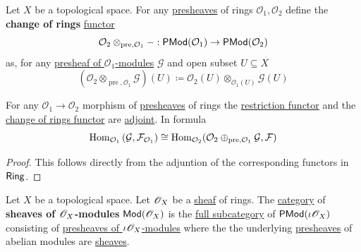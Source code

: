 \documentclass[../../../main]{subfiles}
\begin{document}
\begin{definition} \label{def:tensor-product-presheaf}
  Let \(X\) be a topological space.
  For any \hyperref[def:presheaf]{presheaves} of rings \(\mathcal{O}_{1}, \mathcal{O}_{2}\) define the \textbf{change of rings} \hyperref[def:functor]{functor}
  \begin{equation*}
    \mathcal{O}_{2} \otimes_{\operatorname{pre}, \mathcal{O}_{1}} -: \mathsf{PMod}(\mathcal{O}_{1}) \to \mathsf{PMod}(\mathcal{O}_{2})
  \end{equation*}
  as, for any \hyperref[def:presheaf-of-modules]{presheaf of \(\mathcal{O}_{1}\)-modules} \(\mathcal{G}\) and open subset \(U \subseteq X\)
  \begin{equation*}
    (\mathcal{O}_{2} \otimes_{\operatorname{pre}, \mathcal{O}_{1}} \mathcal{G})(U) \coloneq \mathcal{O}_{2}(U) \otimes_{\mathcal{O}_{1}(U)} \mathcal{G}(U)
  \end{equation*}
\end{definition}

\begin{lemma} \label{lemma:restriction-tensor-adjunction-presheaf}
  For any \(\mathcal{O}_{1} \to  \mathcal{O}_{2}\) morphism of \hyperref[def:presheaf]{presheaves} of rings the \hyperref[def:restriction-presheaf-of-modules]{restriction functor} and the \hyperref[def:tensor-product-presheaf]{change of rings functor} are \hyperref[def:adjoint-functors]{adjoint}. In formula
  \begin{equation*}
    \operatorname{Hom}_{\mathcal{O}_{1}} \left( \mathcal{G}, \mathcal{F}_{\mathcal{O}_{1}} \right) \cong \operatorname{Hom}_{\mathcal{O}_{2}} (\mathcal{O}_{2} \oplus_{\operatorname{pre}, \mathcal{O}_{1}} \mathcal{G}, \mathcal{F})
  \end{equation*}
\end{lemma}
\begin{proof}
  This follows directly from the adjuntion of the corresponding functors in \(\mathsf{Ring}\).
\end{proof}

\begin{definition} \label{def:sheaf-of-modules}
  Let \(X\) be a topological space.
  Let \(\mathscr{O}_{X}\) be a \hyperref[def:sheaf]{sheaf} of rings.
  The \hyperref[def:category]{category} of \textbf{sheaves of \(\mathscr{O}_{X}\)-modules} \(\mathsf{Mod}(\mathscr{O}_{X})\) is the \hyperref[def:subcategory]{full subcategory} of \(\mathsf{PMod}(\iota\mathscr{O}_{X})\) consisting of \hyperref[def:presheaf-of-modules]{presheaves of \(\iota\mathscr{O}_{X}\)-modules} where the the underlying \hyperref[def:presheaf]{presheaves} of abelian modules are \hyperref[def:sheaf]{sheaves}.
\end{definition}
\end{document}
